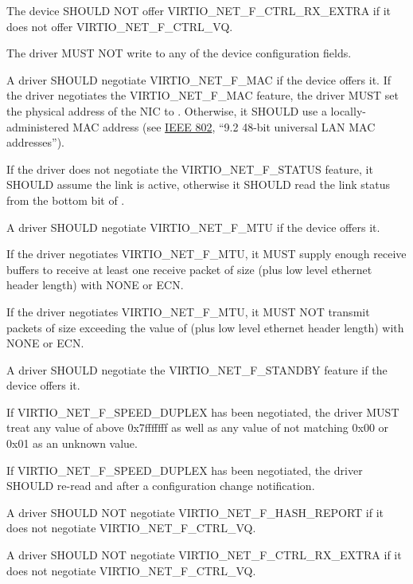 The device SHOULD NOT offer VIRTIO_NET_F_CTRL_RX_EXTRA if it
does not offer VIRTIO_NET_F_CTRL_VQ.


The driver MUST NOT write to any of the device configuration fields.

A driver SHOULD negotiate VIRTIO_NET_F_MAC if the device offers it.
If the driver negotiates the VIRTIO_NET_F_MAC feature, the driver MUST set
the physical address of the NIC to .  Otherwise, it SHOULD
use a locally-administered MAC address (see \hyperref[intro:IEEE 802]{IEEE 802},
``9.2 48-bit universal LAN MAC addresses'').

If the driver does not negotiate the VIRTIO_NET_F_STATUS feature, it SHOULD
assume the link is active, otherwise it SHOULD read the link status from
the bottom bit of .

A driver SHOULD negotiate VIRTIO_NET_F_MTU if the device offers it.

If the driver negotiates VIRTIO_NET_F_MTU, it MUST supply enough receive
buffers to receive at least one receive packet of size  (plus low
level ethernet header length) with  NONE or ECN.

If the driver negotiates VIRTIO_NET_F_MTU, it MUST NOT transmit packets of
size exceeding the value of  (plus low level ethernet header length)
with  NONE or ECN.

A driver SHOULD negotiate the VIRTIO_NET_F_STANDBY feature if the device offers it.

If VIRTIO_NET_F_SPEED_DUPLEX has been negotiated,
the driver MUST treat any value of  above
0x7fffffff as well as any value of  not
matching 0x00 or 0x01 as an unknown value.

If VIRTIO_NET_F_SPEED_DUPLEX has been negotiated, the driver
SHOULD re-read  and  after a
configuration change notification.

A driver SHOULD NOT negotiate VIRTIO_NET_F_HASH_REPORT if it
does not negotiate VIRTIO_NET_F_CTRL_VQ.

A driver SHOULD NOT negotiate VIRTIO_NET_F_CTRL_RX_EXTRA if it
does not negotiate VIRTIO_NET_F_CTRL_VQ.

